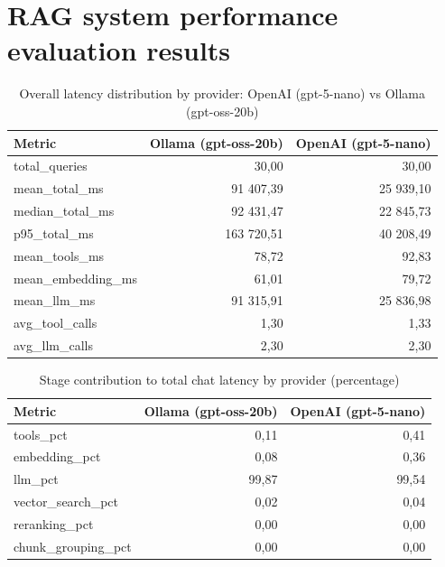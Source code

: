\chapter{RAG system performance evaluation results}
\label{app:performance-tables}
\renewcommand{\tablename}{Table}

\begin{table}[htbp]
    \centering
    \small
    \begin{tabular}{lrr}
        \toprule
        Metric              & Ollama (gpt-oss-20b) & OpenAI (gpt-5-nano) \\
        \midrule
        total\_queries      & 30,00                & 30,00               \\
        mean\_total\_ms     & 91 407,39            & 25 939,10           \\
        median\_total\_ms   & 92 431,47            & 22 845,73           \\
        p95\_total\_ms      & 163 720,51           & 40 208,49           \\
        mean\_tools\_ms     & 78,72                & 92,83               \\
        mean\_embedding\_ms & 61,01                & 79,72               \\
        mean\_llm\_ms       & 91 315,91            & 25 836,98           \\
        avg\_tool\_calls    & 1,30                 & 1,33                \\
        avg\_llm\_calls     & 2,30                 & 2,30                \\
        \bottomrule
    \end{tabular}
    \caption{Overall latency distribution by provider: OpenAI (gpt-5-nano) vs Ollama (gpt-oss-20b)}
    \label{tab:latency-distribution}
\end{table}

\begin{table}[htbp]
    \centering
    \small
    \begin{tabular}{lrr}
        \toprule
        Metric               & Ollama (gpt-oss-20b) & OpenAI (gpt-5-nano) \\
        \midrule
        tools\_pct           & 0,11                 & 0,41                \\
        embedding\_pct       & 0,08                 & 0,36                \\
        llm\_pct             & 99,87                & 99,54               \\
        vector\_search\_pct  & 0,02                 & 0,04                \\
        reranking\_pct       & 0,00                 & 0,00                \\
        chunk\_grouping\_pct & 0,00                 & 0,00                \\
        \bottomrule
    \end{tabular}
    \caption{Stage contribution to total chat latency by provider (percentage)}
    \label{tab:stage-contribution}
\end{table}


